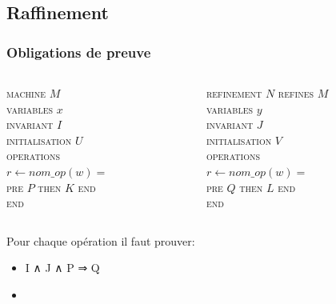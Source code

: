 \documentclass[11pt,a4paper,xcolor=table, handout]{beamer} %
\begin{document}
\subsection{Raffinement}
\begin{frame}
\frametitle{Obligations de preuve}
\begin{columns}[t]
  \begin{column}{5cm}
    \textsc{machine} $M$ \\
    \textsc{variables} $x$ \\
    \textsc{invariant} $I$ \\
    \textsc{initialisation} $U$ \\
    \textsc{operations} \\
    \quad $r \longleftarrow nom\_op(w) =$ \\
    \qquad \textsc{pre} $P$ \textsc{then} $K$ \textsc{end} \\
    \textsc{end}
\end{column}
  
  \begin{column}{5cm}
    \textsc{refinement} $N$ \textsc{refines} $M$ \\
    \textsc{variables} $y$ \\
    \textsc{invariant} $J$ \\
    \textsc{initialisation} $V$ \\
    \textsc{operations} \\
    \quad $r \longleftarrow nom\_op(w) =$ \\
    \qquad \textsc{pre} $Q$ \textsc{then} $L$ \textsc{end} \\
    \textsc{end}  
  \end{column}
\end{columns}  
 
Pour chaque opération il faut prouver:
\begin{itemize}
\item I ∧ J ∧ P ⇒ Q 
\item 
\end{itemize}
\end{frame}
\fi
\end{document}

